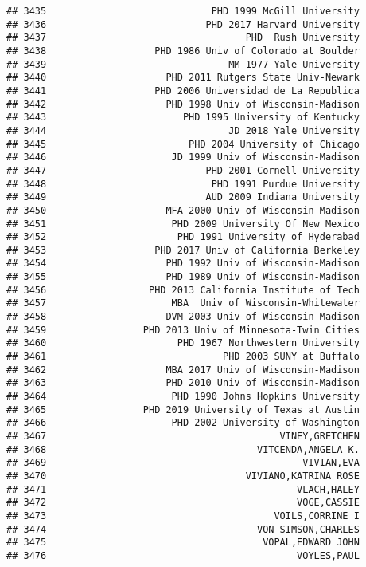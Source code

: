 \documentclass[
]{article}
\begin{document}
\begin{verbatim}
## 3435                             PHD 1999 McGill University
## 3436                            PHD 2017 Harvard University
## 3437                                   PHD  Rush University
## 3438                   PHD 1986 Univ of Colorado at Boulder
## 3439                                MM 1977 Yale University
## 3440                     PHD 2011 Rutgers State Univ-Newark
## 3441                   PHD 2006 Universidad de La Republica
## 3442                     PHD 1998 Univ of Wisconsin-Madison
## 3443                        PHD 1995 University of Kentucky
## 3444                                JD 2018 Yale University
## 3445                         PHD 2004 University of Chicago
## 3446                      JD 1999 Univ of Wisconsin-Madison
## 3447                            PHD 2001 Cornell University
## 3448                             PHD 1991 Purdue University
## 3449                            AUD 2009 Indiana University
## 3450                     MFA 2000 Univ of Wisconsin-Madison
## 3451                      PHD 2009 University Of New Mexico
## 3452                       PHD 1991 University of Hyderabad
## 3453                   PHD 2017 Univ of California Berkeley
## 3454                     PHD 1992 Univ of Wisconsin-Madison
## 3455                     PHD 1989 Univ of Wisconsin-Madison
## 3456                  PHD 2013 California Institute of Tech
## 3457                      MBA  Univ of Wisconsin-Whitewater
## 3458                     DVM 2003 Univ of Wisconsin-Madison
## 3459                 PHD 2013 Univ of Minnesota-Twin Cities
## 3460                       PHD 1967 Northwestern University
## 3461                               PHD 2003 SUNY at Buffalo
## 3462                     MBA 2017 Univ of Wisconsin-Madison
## 3463                     PHD 2010 Univ of Wisconsin-Madison
## 3464                      PHD 1990 Johns Hopkins University
## 3465                 PHD 2019 University of Texas at Austin
## 3466                      PHD 2002 University of Washington
## 3467                                         VINEY,GRETCHEN
## 3468                                     VITCENDA,ANGELA K.
## 3469                                             VIVIAN,EVA
## 3470                                   VIVIANO,KATRINA ROSE
## 3471                                            VLACH,HALEY
## 3472                                            VOGE,CASSIE
## 3473                                        VOILS,CORRINE I
## 3474                                     VON SIMSON,CHARLES
## 3475                                      VOPAL,EDWARD JOHN
## 3476                                            VOYLES,PAUL

\end{verbatim}
\end{document}
